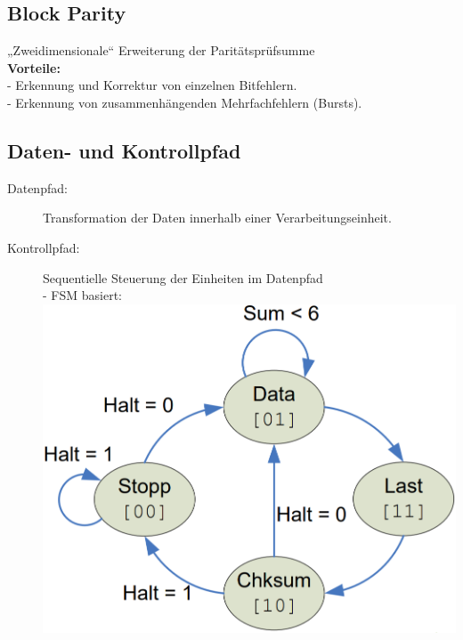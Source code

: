 \documentclass[6pt,a4paper]{scrartcl}
\begin{document}
\begin{multicols*}{3}
\subsection{Block Parity}
„Zweidimensionale“ Erweiterung der Paritätsprüfsumme\\
\textbf{Vorteile:}\\
 - Erkennung und Korrektur von einzelnen Bitfehlern.\\
 - Erkennung von zusammenhängenden Mehrfachfehlern (Bursts).
\subsection{Daten- und Kontrollpfad}
\begin{description}
	\item[Datenpfad:] Transformation der Daten innerhalb einer Verarbeitungseinheit.
	\item[Kontrollpfad:] Sequentielle Steuerung der Einheiten im Datenpfad\\
		- FSM basiert: \\\includegraphics[scale=0.4]{./img/ds/parity_fsm.png}
\end{description}


\end{multicols*}
\end{document}
